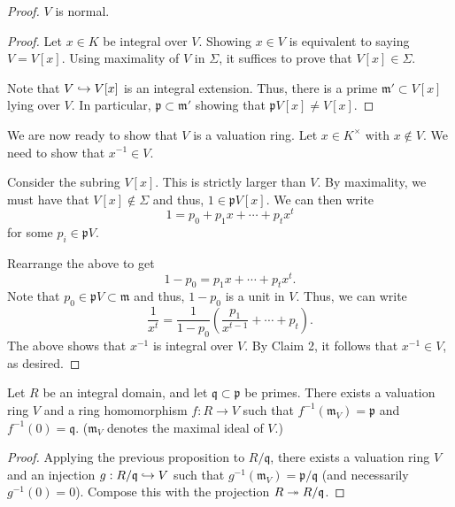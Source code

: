 \documentclass[12pt]{article}
\begin{document}
\begin{proof}
	 $V$ is normal.
	\begin{proof} 
		Let $x \in K$ be integral over $V$. Showing $x \in V$ is equivalent to saying $V = V[x]$. Using maximality of $V$ in $\Sigma$, it suffices to prove that $V[x] \in \Sigma$.

		Note that $V \hookrightarrow V[x]$ is an integral extension. Thus, there is a prime $\mathfrak{m}' \subset V[x]$ lying over $V$. In particular, $\mathfrak{p} \subset \mathfrak{m}'$ showing that $\mathfrak{p} V[x] \neq V[x]$.
	\end{proof}

	We are now ready to show that $V$ is a valuation ring. Let $x \in K^{\times}$ with $x \notin V$. We need to show that $x^{-1} \in V$. \newline
	
	Consider the subring $V[x]$. This is strictly larger than $V$. By maximality, we must have that $V[x] \notin \Sigma$ and thus, $1 \in \mathfrak{p} V[x]$. We can then write
	\begin{equation*} 
		1 = p_{0} + p_{1} x + \cdots + p_{t} x^{t}
	\end{equation*}
	for some $p_{i} \in \mathfrak{p} V$.

	Rearrange the above to get
	\begin{equation*} 
		1 - p_{0} = p_{1} x + \cdots + p_{t} x^{t}.
	\end{equation*}
	Note that $p_{0} \in \mathfrak{p} V \subset \mathfrak{m}$ and thus, $1 - p_{0}$ is a unit in $V$. Thus, we can write
	\begin{equation*} 
		\frac{1}{x^{t}} = \frac{1}{1 - p_{0}}\left(\frac{p_{1}}{x^{t - 1}} + \cdots + p_{t}\right).
	\end{equation*}
	The above shows that $x^{-1}$ is integral over $V$. By Claim 2, it follows that $x^{-1} \in V$, as desired.
\end{proof}

\begin{cor}
	Let $R$ be an integral domain, and let $\mathfrak{q} \subset \mathfrak{p}$ be primes. There exists a valuation ring $V$ and a ring homomorphism $f : R \to V$ such that $f^{-1}(\mathfrak{m}_{V}) = \mathfrak{p}$ and $f^{-1}(0) = \mathfrak{q}$. \newline
	($\mathfrak{m}_{V}$ denotes the maximal ideal of $V$.)
\end{cor}
\begin{proof} 
	Applying the previous proposition to $R/\mathfrak{q}$, there exists a valuation ring $V$ and an injection $g : R/\mathfrak{q} \hookrightarrow V$ such that $g^{-1}(\mathfrak{m}_{V}) = \mathfrak{p}/\mathfrak{q}$ (and necessarily $g^{-1}(0) = 0$). \newline
	Compose this with the projection $R \twoheadrightarrow R/\mathfrak{q}$.
\end{proof}
\end{document}
